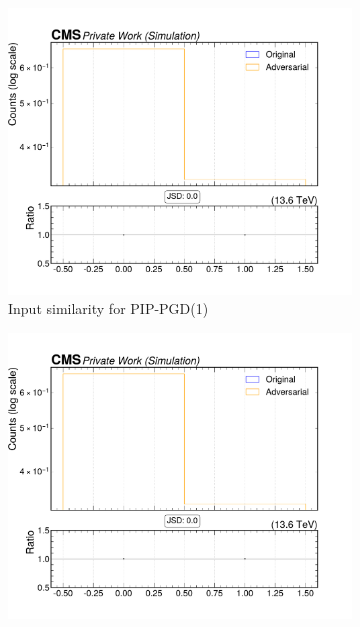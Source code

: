 \begin{figure}[htbp]
  \centering
  \begin{subfigure}[t]{0.32\textwidth}
    \includegraphics[width=\linewidth]{media/output/features/compare/combined_it_1/cmp_cpf_arr_Cpfcan_puppiw.pdf}
    \caption*{Input similarity for PIP-PGD(1)}
  \end{subfigure}\hfill
  \begin{subfigure}[t]{0.32\textwidth}
    \includegraphics[width=\linewidth]{media/output/features/compare/combined_it_2/cmp_cpf_arr_Cpfcan_puppiw.pdf}

\end{subfigure}
\end{figure}
